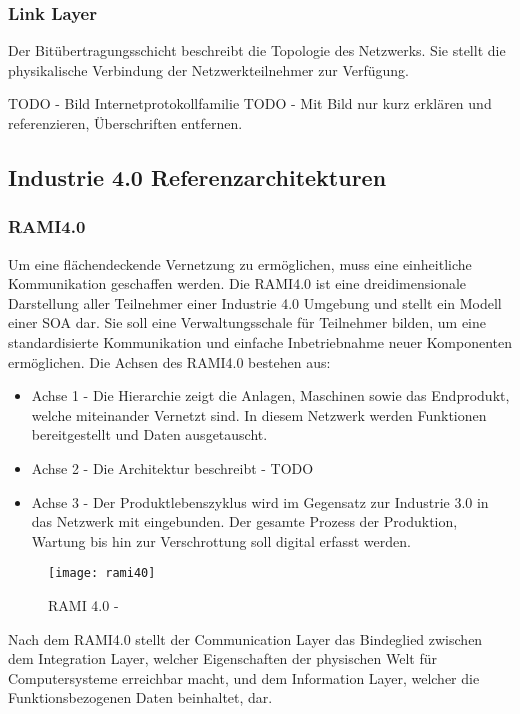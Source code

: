 \subsubsection{Link Layer}
Der Bitübertragungsschicht beschreibt die Topologie des Netzwerks. Sie stellt die physikalische Verbindung der Netzwerkteilnehmer zur Verfügung.

TODO - Bild Internetprotokollfamilie
TODO - Mit Bild nur kurz erklären und referenzieren, Überschriften entfernen.

\subsection{Industrie 4.0 Referenzarchitekturen}
\subsubsection{\ac{RAMI4.0}}
Um eine flächendeckende Vernetzung zu ermöglichen, muss eine einheitliche Kommunikation geschaffen werden. Die \ac{RAMI4.0} ist eine dreidimensionale Darstellung aller Teilnehmer einer Industrie 4.0 Umgebung und stellt ein Modell einer \ac{SOA} dar. Sie soll eine Verwaltungsschale für Teilnehmer bilden, um eine standardisierte Kommunikation und einfache Inbetriebnahme neuer Komponenten ermöglichen. \cite{rami2016} Die Achsen des \ac{RAMI4.0} bestehen aus:

\begin{itemize}
  \item Achse 1 - Die Hierarchie zeigt die Anlagen, Maschinen sowie das Endprodukt, welche miteinander Vernetzt sind. In diesem Netzwerk werden Funktionen bereitgestellt und Daten ausgetauscht.
  \item Achse 2 - Die Architektur beschreibt - TODO
  \item Achse 3 - Der Produktlebenszyklus wird im Gegensatz zur Industrie 3.0 in das Netzwerk mit eingebunden. Der gesamte Prozess der Produktion, Wartung bis hin zur Verschrottung soll digital erfasst werden.
\end{itemize}

\begin{figure}[h]
  \centering
  \texttt{[image: rami40]}
  \caption{RAMI 4.0 - \cite{rami2016}}
  \label{Kap2:RAMI 4.0}
\end{figure}

\clearpage

Nach dem \ac{RAMI4.0} stellt der Communication Layer das Bindeglied zwischen dem Integration Layer, welcher Eigenschaften der physischen Welt für Computersysteme erreichbar macht, und dem Information Layer, welcher die Funktionsbezogenen Daten beinhaltet, dar. \cite{BMWiNeCon2016} 

